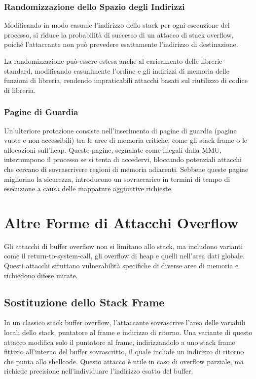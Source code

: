 \subsubsection{Randomizzazione dello Spazio degli Indirizzi}

Modificando in modo casuale l'indirizzo dello stack per ogni esecuzione del processo, si riduce la probabilità di successo di un attacco di stack overflow, poiché l'attaccante non può prevedere esattamente l'indirizzo di destinazione.

La randomizzazione può essere estesa anche al caricamento delle librerie standard, modificando casualmente l'ordine e gli indirizzi di memoria delle funzioni di libreria, rendendo impraticabili attacchi basati sul riutilizzo di codice di libreria.

\subsubsection{Pagine di Guardia}

Un'ulteriore protezione consiste nell'inserimento di pagine di guardia (pagine vuote e non accessibili) tra le aree di memoria critiche, come gli stack frame o le allocazioni sull'heap. Queste pagine, segnalate come illegali dalla MMU, interrompono il processo se si tenta di accedervi, bloccando potenziali attacchi che cercano di sovrascrivere regioni di memoria adiacenti. Sebbene queste pagine migliorino la sicurezza, introducono un sovraccarico in termini di tempo di esecuzione a causa delle mappature aggiuntive richieste.

\section{Altre Forme di Attacchi Overflow}

Gli attacchi di buffer overflow non si limitano allo stack, ma includono varianti come il return-to-system-call, gli overflow di heap e quelli nell'area dati globale. Questi attacchi sfruttano vulnerabilità specifiche di diverse aree di memoria e richiedono difese mirate.

\subsection{Sostituzione dello Stack Frame}

In un classico stack buffer overflow, l'attaccante sovrascrive l'area delle variabili locali dello stack, puntatore al frame e indirizzo di ritorno. Una variante di questo attacco modifica solo il puntatore al frame, indirizzandolo a uno stack frame fittizio all'interno del buffer sovrascritto, il quale include un indirizzo di ritorno che punta allo shellcode. Questo attacco è utile in caso di overflow parziale, ma richiede precisione nell'individuare l'indirizzo esatto del buffer.

